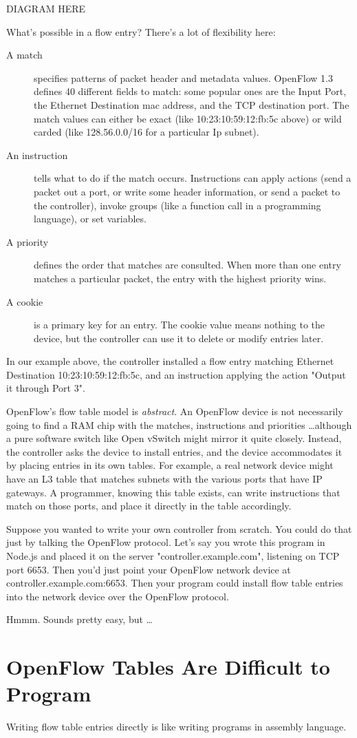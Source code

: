 DIAGRAM HERE

What's possible in a flow entry?
There's a lot of flexibility here:

\begin{description}
\item[A match] specifies patterns of packet header and metadata values.
OpenFlow 1.3 defines 40 different fields to match: some popular ones are the Input Port, 
the Ethernet Destination mac address, and the TCP destination port.
The match values can either be exact (like 10:23:10:59:12:fb:5c above) or wild carded (like 128.56.0.0/16 for a
particular Ip subnet).
\item[An instruction] tells what to do if the match occurs.  
Instructions can apply actions (send a packet out a port, or write some header information, 
or send a packet to the controller), 
invoke groups (like a function call in a programming language), or set variables.
\item[A priority] defines the order that matches are consulted.  
When more than one entry matches a particular packet, the entry with the highest priority wins.
\item[A cookie] is a primary key for an entry.
The cookie value means nothing to the device, but the controller can use it to delete or modify entries later.
\end{description}

In our example above, the controller installed a flow entry matching Ethernet Destination 10:23:10:59:12:fb:5c, 
and an instruction applying the action "Output it through Port 3".

OpenFlow's flow table model is \textit{abstract}.
An OpenFlow device is not necessarily going to find a RAM chip with the matches, 
instructions and priorities \ldots although a pure software switch like Open vSwitch might mirror it quite closely.
Instead, the controller asks the device to install entries, and the device accommodates it by placing entries in its
own tables.
For example, a real network device might have an L3 table that matches subnets with the various ports that have
IP gateways.
A programmer, knowing this table exists, can write instructions that match on those ports, and place it directly in the
table accordingly.

Suppose you wanted to write your own controller from scratch.  
You could do that just by talking the OpenFlow protocol.
Let's say you wrote this program in Node.js and placed it on the server "controller.example.com", 
listening on TCP port 6653.
Then you'd just point your OpenFlow network device at controller.example.com:6653.
Then your program could install flow table entries into the network device over the OpenFlow protocol.

Hmmm.
Sounds pretty easy, but \ldots

\section{OpenFlow Tables Are Difficult to Program}

Writing flow table entries directly is like writing programs in assembly language.

